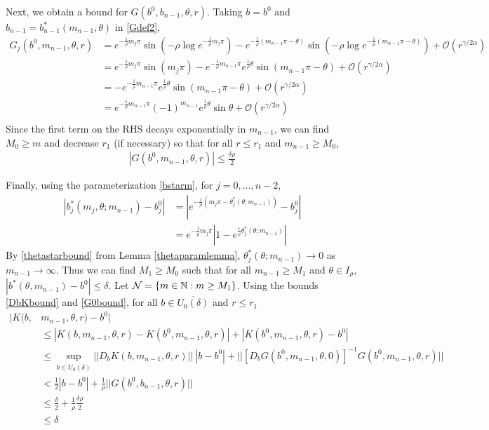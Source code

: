 \documentclass[thesis.tex]{subfiles}
\begin{document}
Next, we obtain a bound for $G(b^0, b_{n-1}, \theta, r)$. Taking $b = b^0$ and $b_{n-1} = b_{n-1}^*(m_{n-1}, \theta)$ in \eqref{Gdef2},
\begin{align*}
G_j(b^0, m_{n-1}, \theta, r) &= e^{-\frac{1}{\rho}m_j \pi} \sin \left( -\rho \log e^{-\frac{1}{\rho}m_j \pi} \right) - e^{-\frac{1}{\rho}(m_{n-1}\pi - \theta)} \sin \left( -\rho \log e^{-\frac{1}{\rho}(m_{n-1}\pi - \theta)} \right) + \mathcal{O}(r^{\gamma / 2 \alpha}) \\
&= e^{-\frac{1}{\rho}m_j \pi} \sin \left( m_j \pi \right) - e^{-\frac{1}{\rho} m_{n-1}\pi } e^{\frac{1}{\rho}\theta } \sin \left(m_{n-1} \pi - \theta \right) + \mathcal{O}(r^{\gamma / 2 \alpha}) \\
&= -e^{-\frac{1}{\rho} m_{n-1}\pi } e^{\frac{1}{\rho}\theta } \sin \left(m_{n-1} \pi - \theta \right) + \mathcal{O}(r^{\gamma / 2 \alpha}) \\
&= e^{-\frac{1}{\rho} m_{n-1}\pi } (-1)^{m_{n-1}} e^{\frac{1}{\rho}\theta } \sin \theta + \mathcal{O}(r^{\gamma / 2 \alpha}) \\
\end{align*}
Since the first term on the RHS decays exponentially in $m_{n-1}$, we can find $M_0 \geq m$ and decrease $r_1$ (if necessary) so that for all $r \leq r_1$ and $m_{n-1} \geq M_0$,
\begin{align}\label{G0bound}
|G(b^0, m_{n-1}, \theta, r)| \leq \frac{\delta \rho}{2}
\end{align}

Finally, using the parameterization \eqref{bstarm}, for $j = 0, \dots, n-2$,
\begin{align*}
| b_j^*(m_j, \theta; m_{n-1}) - b_j^0| &=
| e^{-\frac{1}{\rho}(m_j \pi - \theta_j^*(\theta; m_{n-1}))} - b_j^0 | \\
&= e^{-\frac{1}{\rho}m_j \pi}| 1 - e^{\frac{1}{\rho} \theta_j^*(\theta; m_{n-1})}| 
\end{align*}
By \eqref{thetastarbound} from Lemma \ref{thetaparamlemma}, $\theta_j^*(\theta; m_{n-1}) \rightarrow 0$ as $m_{n-1} \rightarrow \infty$. Thus we can find $M_1 \geq M_0$ such that for all $m_{n-1} \geq M_1$ and $\theta \in I_\rho$, $|b^*(\theta, m_{n-1}) - b^0| \leq \delta$. Let $\mathcal{N} = \{ m \in \mathbb{N} : m \geq M_1 \}$. Using the bounds \eqref{DbKbound} and \eqref{G0bound}, for all $b \in \overline{U_0(\delta)}$ and $r \leq r_1$
\begin{align*}
|K(b, &m_{n-1}, \theta, r) - b^0| \\
&\leq |K(b, m_{n-1}, \theta, r) - K(b^0, m_{n-1}, \theta, r)| + |K(b^0, m_{n-1}, \theta, r) - b^0| \\ 
&\leq \sup_{b\in \overline{U_0(\delta)}}||D_b K(b, m_{n-1}, \theta, r)||\:|b - b^0| 
+ || [D_b G(b^0, m_{n-1}, \theta, 0)]^{-1} G(b^0, m_{n-1}, \theta, r) || \\
&< \frac{1}{2} |b - b^0| + \frac{1}{\rho} ||G(b^0, b_{n-1}, \theta, r) ||  \\
&\leq \frac{\delta}{2} + \frac{1}{\rho}\frac{\delta \rho}{2} \\
&\leq \delta
\end{align*} 
\end{document}
